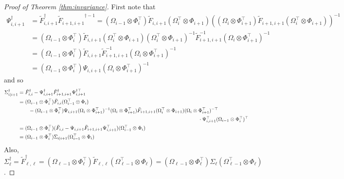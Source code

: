 \documentclass[12pt]{article}
\begin{document}
\begin{proof}[Proof of Theorem \ref{thm:invariance}]
First note that
\begin{align*}
\Psi^\dagger_{i,i+1} &= \tilde{F}^\dagger_{i,i+1} {\tilde{F}_{i+1,i+1}}^{\dagger-1} = (\Omega_{i-1} \otimes \Phi_i^\top) \tilde{F}_{i,i+1} (\Omega_{i}^\top \otimes \Phi_{i+1}) \left(  (\Omega_i \otimes \Phi_{i+1}^\top) \tilde{F}_{i+1,i+1} (\Omega_i^\top \otimes \Phi_{i+1}) \right)^{-1} \\
&= (\Omega_{i-1} \otimes \Phi_i^\top) \tilde{F}_{i,i+1} (\Omega_{i}^\top \otimes \Phi_{i+1}) (\Omega_i^\top \otimes \Phi_{i+1})^{-1} \tilde{F}_{i+1,i+1}^{-1} (\Omega_i \otimes \Phi_{i+1}^\top)^{-1} \\
&= (\Omega_{i-1} \otimes \Phi_i^\top) \tilde{F}_{i,i+1} \tilde{F}_{i+1,i+1}^{-1} (\Omega_i \otimes \Phi_{i+1}^\top)^{-1} \\
&= (\Omega_{i-1} \otimes \Phi_i^\top) \Psi_{i,i+1} (\Omega_i \otimes \Phi_{i+1}^\top)^{-1}
\end{align*}
and so
\begin{align*}
\Sigma^\dagger_{i|i+1} &= \tilde{F}^\dagger_{i,i} - \Psi^\dagger_{i,i+1} \tilde{F}^\dagger_{i+1,i+1} \Psi_{i,i+1}^{\dagger\top} \\
&= (\Omega_{i-1} \otimes \Phi_i^\top) \tilde{F}_{i,i} (\Omega_{i-1}^\top \otimes \Phi_i) \\
& \quad\quad - (\Omega_{i-1} \otimes \Phi_i^\top) \Psi_{i,i+1} (\Omega_i \otimes \Phi_{i+1}^\top)^{-1}  (\Omega_i \otimes \Phi_{i+1}^\top) \tilde{F}_{i+1,i+1} (\Omega_i^\top \otimes \Phi_{i+1})   (\Omega_i \otimes \Phi_{i+1}^\top)^{-\top} \\
&\hspace{4.75in} \cdot \Psi_{i,i+1}^\top (\Omega_{i-1} \otimes \Phi_i^\top)^\top \\
&= (\Omega_{i-1} \otimes \Phi_i^\top) (\tilde{F}_{i,i} - \Psi_{i,i+1} \tilde{F}_{i+1,i+1} \Psi_{i,i+1}^\top) (\Omega_{i-1}^\top \otimes \Phi_i) \\
& = (\Omega_{i-1} \otimes \Phi_i^\top) \Sigma_{i|i+1} (\Omega_{i-1}^\top \otimes \Phi_i)
\end{align*}
Also, $\Sigma^\dagger_\ell = \tilde{F}^\dagger_{\ell,\ell} = (\Omega_{\ell-1} \otimes \Phi_\ell^\top) \tilde{F}_{\ell,\ell} (\Omega_{\ell-1}^\top \otimes \Phi_\ell) = (\Omega_{\ell-1} \otimes \Phi_\ell^\top) \Sigma_\ell (\Omega_{\ell-1}^\top \otimes \Phi_\ell)$.


\end{proof}
\end{document}
